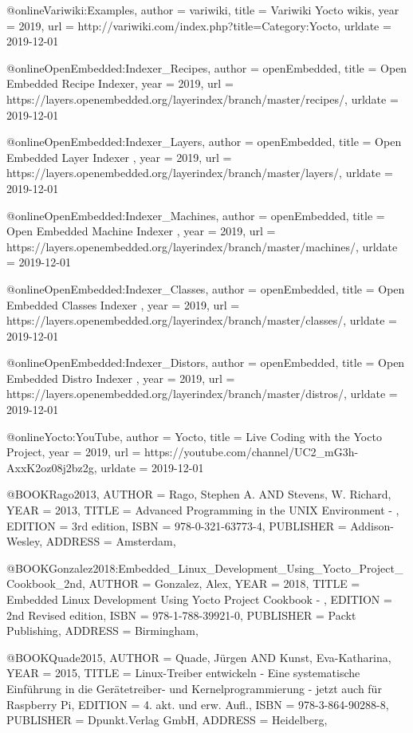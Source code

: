 @online{Variwiki:Examples,
author = {variwiki},
title = {Variwiki Yocto wikis},
year = 2019,
url = {http://variwiki.com/index.php?title=Category:Yocto},
urldate = {2019-12-01}
}


@online{OpenEmbedded:Indexer_Recipes,
author = {openEmbedded},
title = {Open Embedded Recipe Indexer},
year = 2019,
url = {https://layers.openembedded.org/layerindex/branch/master/recipes/},
urldate = {2019-12-01}
}


@online{OpenEmbedded:Indexer_Layers,
author = {openEmbedded},
title = {Open Embedded Layer Indexer },
year = 2019,
url = {https://layers.openembedded.org/layerindex/branch/master/layers/},
urldate = {2019-12-01}
}


@online{OpenEmbedded:Indexer_Machines,
author = {openEmbedded},
title = {Open Embedded Machine Indexer },
year = 2019,
url = {https://layers.openembedded.org/layerindex/branch/master/machines/},
urldate = {2019-12-01}
}

@online{OpenEmbedded:Indexer_Classes,
author = {openEmbedded},
title = {Open Embedded Classes Indexer },
year = 2019,
url = {https://layers.openembedded.org/layerindex/branch/master/classes/},
urldate = {2019-12-01}
}

@online{OpenEmbedded:Indexer_Distors,
author = {openEmbedded},
title = {Open Embedded Distro Indexer },
year = 2019,
url = {https://layers.openembedded.org/layerindex/branch/master/distros/},
urldate = {2019-12-01}
}

@online{Yocto:YouTube,
author = {Yocto},
title = {Live Coding with the Yocto Project},
year = 2019,
url = {https://youtube.com/channel/UC2_mG3h-AxxK2oz08j2bz2g},
urldate = {2019-12-01}
}

@BOOK{Rago2013,
	AUTHOR = {Rago, Stephen A. AND Stevens, W. Richard},
	YEAR = {2013},
	TITLE = {Advanced Programming in the UNIX Environment - },
	EDITION = {3rd edition},
	ISBN = {978-0-321-63773-4},
	PUBLISHER = {Addison-Wesley},
	ADDRESS = {Amsterdam},
}


@BOOK{Gonzalez2018:Embedded_Linux_Development_Using_Yocto_Project_Cookbook_2nd,
	AUTHOR = {Gonzalez, Alex},
	YEAR = {2018},
	TITLE = {Embedded Linux Development Using Yocto Project Cookbook - },
	EDITION = {2nd Revised edition},
	ISBN = {978-1-788-39921-0},
	PUBLISHER = {Packt Publishing},
	ADDRESS = {Birmingham},
}

@BOOK{Quade2015,
	AUTHOR = {Quade, Jürgen AND Kunst, Eva-Katharina},
	YEAR = {2015},
	TITLE = {Linux-Treiber entwickeln - Eine systematische Einführung in die Gerätetreiber- und Kernelprogrammierung - jetzt auch für Raspberry Pi},
	EDITION = {4. akt. und erw. Aufl.},
	ISBN = {978-3-864-90288-8},
	PUBLISHER = {Dpunkt.Verlag GmbH},
	ADDRESS = {Heidelberg},
}

